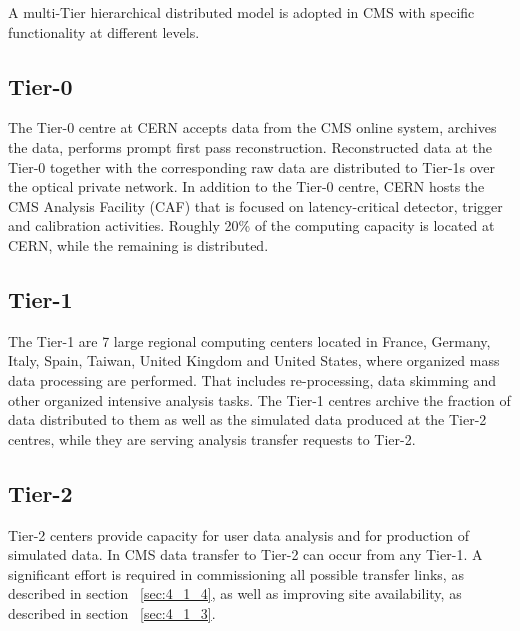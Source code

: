 A multi-Tier hierarchical distributed model is adopted in CMS with specific functionality at different levels.
\subsection{Tier-0}
\label{sec:2_1}
The Tier-0 centre at CERN accepts data from the CMS online system, archives the data, performs prompt first pass reconstruction. Reconstructed data at the Tier-0 together with the corresponding raw data are distributed to Tier-1s over the optical private network. In addition to the Tier-0 centre, CERN hosts the CMS Analysis Facility (CAF) that is focused on latency-critical detector, trigger and calibration activities.
Roughly 20\% of the computing capacity is located at CERN, while the remaining is distributed.

\subsection{Tier-1}
\label{sec:2_2}
The Tier-1 are 7 large regional computing centers located in France, Germany, Italy, Spain, Taiwan, United Kingdom and United States, where organized mass data processing are performed. That includes re-processing, data skimming and other organized intensive analysis tasks. 
The Tier-1 centres archive the fraction of data distributed to them as well as the simulated data produced at the Tier-2 centres,  while they are serving analysis transfer requests to Tier-2.

\subsection{Tier-2}
\label{sec:2_3}
Tier-2 centers provide capacity for user data analysis and for production of simulated data.
In CMS data transfer to Tier-2 can occur from any Tier-1. A significant effort is required in 
commissioning all possible transfer links, as described in section ~\ref{sec:4_1_4}, as well
as improving site availability, as described in section ~\ref{sec:4_1_3}.

